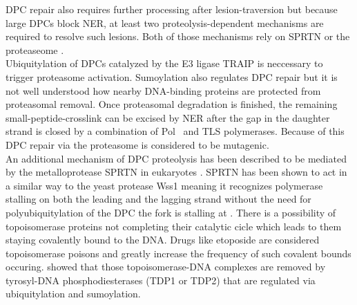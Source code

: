 DPC repair also requires further processing after lesion-traversion but because large DPCs block NER, at least two proteolysis-dependent mechanisms are required to resolve such lesions. Both of those mechanisms rely on SPRTN or the proteaseome \citep{Stingele.2016,Vaz.2016}.\\
Ubiquitylation of DPCs catalyzed by the E3 ligase TRAIP is neccessary to trigger proteasome activation. Sumoylation also regulates DPC repair but it is not well understood how nearby DNA-binding proteins are protected from proteasomal removal. Once proteasomal degradation is finished, the remaining small-peptide-crosslink can be excised by NER after the gap in the daughter strand is closed by a combination of Pol\textdelta~ and TLS polymerases. Because of this DPC repair via the proteasome is considered to be mutagenic.\\ An additional mechanism of DPC proteolysis has been described to be mediated by the metalloprotease SPRTN in eukaryotes \citep{Gao.2018}. SPRTN has been shown to act in a similar way to the yeast protease Wss1 \citep{Stingele.2015} meaning it recognizes polymerase stalling on both the leading and the lagging strand without the need for polyubiquitylation of the DPC the fork is stalling at \citep{Larsen.2019}.   
There is a possibility of topoisomerase proteins not completing their catalytic cicle which leads to them staying covalently bound to the DNA. Drugs like etoposide are considered topoisomerase poisons and greatly increase the frequency of such covalent bounds occuring. \cite{Pommier.2014} showed that those topoisomerase-DNA complexes are removed by tyrosyl-DNA phosphodiesterases (TDP1 or TDP2) that are regulated via ubiquitylation and sumoylation.

